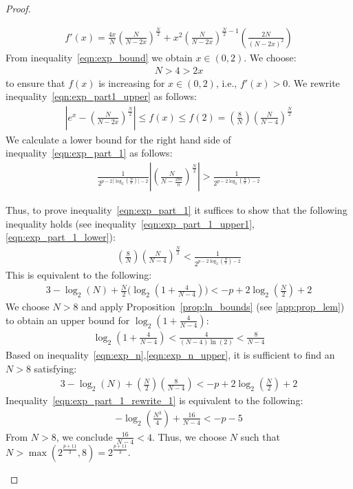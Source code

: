 \documentclass{article}
\numberwithin{mytheorem}{section}
\begin{document}
\begin{proof}
\begin{enumerate}[i.]
\begin{align*}
f'(x)=\frac{4x}{N}(\frac{N}{N-2x})^{\frac{N}{2}}+x^2(\frac{N}{N-2x})^{\frac{N}{2}-1}(\frac{2N}{(N-2x)^2})
\end{align*}
From inequality~\eqref{eqn:exp_bound} we obtain $x\in(0,2)$. We choose:
\begin{align}
N> 4>2x\label{eqn:exp_bound1}
\end{align}
to ensure that $f(x)$ is increasing for $x\in (0,2)$, i.e., $f'(x)>0$. We rewrite inequality~\eqref{eqn:exp_part1_upper} as follows:
\begin{align}
|e^x-(\frac{N}{N-2x})^{\frac{N}{2}}|\leq f(x) \leq f(2)=(\frac{8}{N})(\frac{N}{N-4})^{\frac{N}{2}}\label{eqn:exp_part_1_upper1}
\end{align}
We calculate a lower bound for the right hand side of inequality~\eqref{eqn:exp_part_1} as follows:
\begin{align}
\frac{1}{2^{p-2\lceil\log_2(\frac{N}{2}) \rceil-2}}|(\frac{N}{N-\frac{2m}{n}})^{\frac{N}{2}}|>\frac{1}{2^{p-2\log_2(\frac{N}{2})-2}}\label{eqn:exp_part_1_lower}
\end{align}

Thus, to prove inequality~\eqref{eqn:exp_part_1} it suffices to show that the following inequality holds (see inequality~\eqref{eqn:exp_part_1_upper1}, \eqref{eqn:exp_part_1_lower}):
\begin{align*}
(\frac{8}{N})(\frac{N}{N-4})^{\frac{N}{2}}<\frac{1}{2^{p-2\log_2(\frac{N}{2})-2}}
\end{align*}
This is equivalent to the following:
\begin{align}
3-\log_2(N)+\frac{N}{2}\big(\log_2(1+\frac{4}{N-4})\big)<-p+2\log_2(\frac{N}{2})+2\label{eqn:exp_n}
\end{align}
We choose $N>8$ and apply Proposition~\ref{prop:ln_bounds} (see \ref{app:prop_lem}) to obtain an upper bound for $\log_2(1+\frac{4}{N-4})$:
\begin{align}
\log_2(1+\frac{4}{N-4})<\frac{4}{(N-4)\ln(2)}<\frac{8}{N-4}\label{eqn:exp_n_upper}
\end{align}
Based on inequality~\eqref{eqn:exp_n},\eqref{eqn:exp_n_upper}, it is sufficient to find an $N>8$ satisfying: 
\begin{align}
3-\log_2(N)+(\frac{N}{2})(\frac{8}{N-4})<-p+2\log_2(\frac{N}{2})+2\label{eqn:exp_part_1_rewrite_1}
\end{align}
Inequality~\eqref{eqn:exp_part_1_rewrite_1} is equivalent to the following:
\begin{align*}
-\log_2(\frac{N^3}{4})+\frac{16}{N-4}<-p-5
\end{align*}
From $N>8$, we conclude $\frac{16}{N-4}<4$. Thus, we choose $N$ such that $N>\max(2^{\frac{p+11}{3}},8)=2^{\frac{p+11}{3}}$.


\end{enumerate}
\end{proof}
\end{document}
